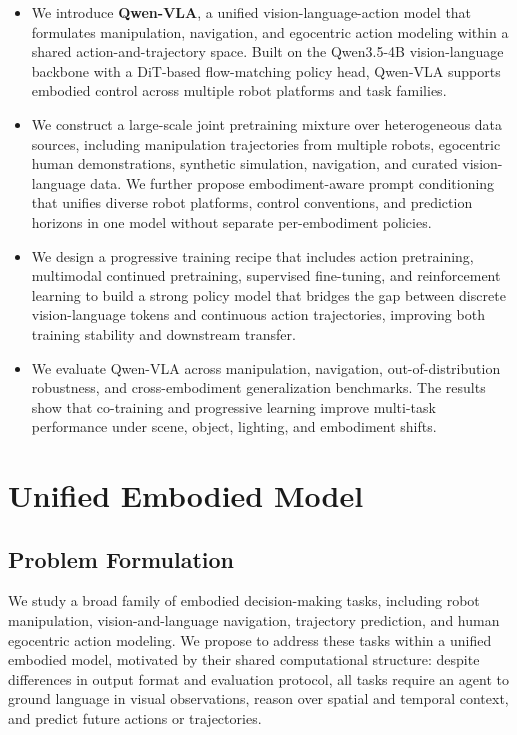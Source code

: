 \documentclass{llmxive}
\begin{document}
\begin{itemize}
      \item We introduce \textbf{Qwen-VLA}, a unified vision-language-action model that formulates manipulation, navigation, and egocentric action modeling within a shared action-and-trajectory space. Built on the Qwen3.5-4B vision-language backbone with a DiT-based flow-matching policy head, Qwen-VLA supports embodied control across multiple robot platforms and task families.

      \item We construct a large-scale joint pretraining mixture over heterogeneous data sources, including manipulation trajectories from multiple robots, egocentric human demonstrations, synthetic simulation, navigation, and curated vision-language data. We further propose embodiment-aware prompt conditioning that unifies diverse robot platforms, control conventions, and prediction horizons in one model without separate per-embodiment policies.

      \item We design a progressive training recipe that includes action pretraining, multimodal continued pretraining, supervised fine-tuning, and reinforcement learning to build a strong policy model that bridges the gap between discrete vision-language tokens and continuous action trajectories, improving both training stability and downstream transfer.
      
      \item We evaluate Qwen-VLA across manipulation, navigation, out-of-distribution robustness, and cross-embodiment generalization benchmarks. The results show that co-training and progressive learning improve multi-task performance under scene, object, lighting, and embodiment shifts.
  \end{itemize}


\section{Unified Embodied Model}
\subsection{Problem Formulation}

We study a broad family of embodied decision-making tasks, including robot manipulation, vision-and-language navigation, trajectory prediction, and human egocentric action modeling. We propose to address these tasks within a unified embodied model, motivated by their shared computational structure: despite differences in output format and evaluation protocol, all tasks require  an agent to ground language in visual observations, reason over spatial and temporal context, and predict future actions or trajectories.
\end{document}
